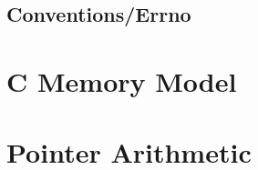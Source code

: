 \subsection{Conventions/Errno}

\section{C Memory Model}

\section{Pointer Arithmetic}

\begin{comment}

\subsection{How are C strings represented?}\label{how-are-c-strings-represented}

They are represented as characters in memory. The end of the string includes a NULL (0) byte \cite{CITATION_NEEDED}. So ``ABC'' requires four(4) bytes \texttt{{[}\textquotesingle{}A\textquotesingle{},\textquotesingle{}B\textquotesingle{},\textquotesingle{}C\textquotesingle{},\textquotesingle{}\textbackslash{}0\textquotesingle{}{]}}.
The only way to find out the length of a C string is to keep reading memory until you find the NULL byte. C characters are always exactly one byte each.

When you write a string literal \texttt{"ABC"} in an expression the string literal evaluates to a char pointer (\texttt{char\ *}), which points to the first byte/char of the string. This means \texttt{ptr} in the example below will hold the memory address of the first character in the string.

\begin{lstlisting}[language=C]
char *ptr = "ABC"
\end{lstlisting}

Some common ways to initialize a string include:

\begin{lstlisting}[language=C]
char *str = "ABC";
char str[] = "ABC";
char str[]={'A','B','C','\0'};
\end{lstlisting}

\subsection{How do you declare a pointer?}\label{how-do-you-declare-a-pointer}


\end{comment}
